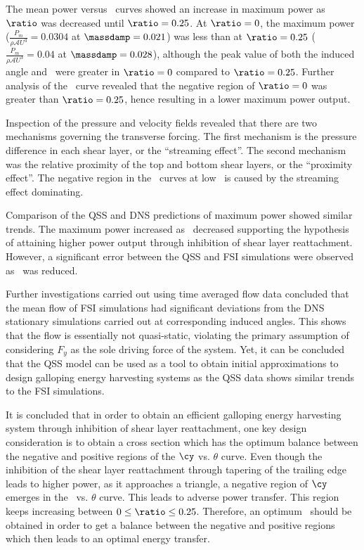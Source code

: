  The mean power versus \massdamp\ curves showed an increase in maximum power as $\ratio$ was decreased until $\ratio=0.25$. At $\ratio=0$, the maximum power ($\displaystyle\frac{P_{m}}{\rho \mathcal{A}U^3}=0.0304$ at $\massdamp=0.021$) was less than at $\ratio=0.25$ ($\displaystyle\frac{P_{m}}{\rho \mathcal{A}U^3}=0.04$ at $\massdamp=0.028$), although the peak value of both the induced angle and \cy\ were greater in $\ratio=0$ compared to $\ratio=0.25$. Further analysis of the \cy\ curve revealed that the negative region of $\ratio=0$  was greater than $\ratio=0.25$, hence resulting in a lower maximum power output. 
 
Inspection of the pressure and velocity fields revealed that there are two mechanisms governing the transverse forcing. The first mechanism is the pressure difference in each shear layer, or the ``streaming effect''. The second mechanism was the relative proximity of the top and bottom shear layers, or the ``proximity effect''. The negative region in the \cy\ curves at low \ratio\ is caused by the streaming effect dominating.
  
 Comparison of the QSS and DNS predictions of maximum power showed similar trends. The maximum power increased as \ratio\  decreased supporting the hypothesis of attaining higher power output through inhibition of shear layer reattachment. However, a significant error between the QSS and FSI simulations were observed as \ratio\ was reduced. 
 
 Further investigations carried out using time averaged flow data concluded that the mean flow of FSI simulations had significant deviations from the DNS stationary simulations carried out at corresponding induced angles. This shows that the flow is essentially not quasi-static, violating the primary assumption of considering $F_y$ as the sole driving force of the system. Yet, it can be concluded that the QSS model can be used as a tool to obtain initial approximations to design galloping energy harvesting systems as the QSS data shows similar trends to the FSI simulations.
 
 It is concluded that in order to obtain an efficient galloping energy harvesting system through inhibition of shear layer reattachment, one key design consideration is to obtain a cross section which has the optimum balance between the negative and positive regions of the $\cy$ vs. $\theta$ curve. Even though the inhibition of  the shear layer reattachment through tapering of the trailing edge leads to higher power, as it approaches a triangle, a negative region of $\cy$ emerges in the \cy\ vs. $\theta$ curve. This leads to adverse power transfer. This region keeps increasing between $0\leq\ratio\leq0.25$. Therefore, an optimum \ratio\ should be obtained in order to get a balance between the negative and positive regions which  then leads to an optimal energy transfer. 
 
